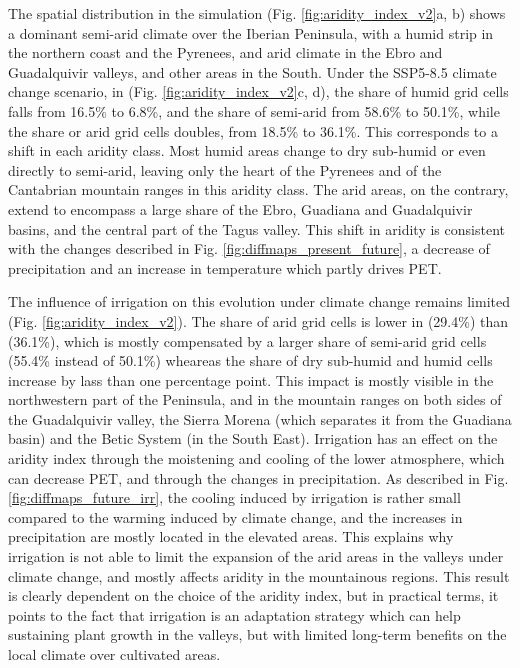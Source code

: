 The spatial distribution in the \presnoirr simulation (Fig. \ref{fig:aridity_index_v2}a, b) shows a dominant semi-arid climate over the Iberian Peninsula, with a humid strip in the northern coast and the Pyrenees, and arid climate in the Ebro and Guadalquivir valleys, and other areas in the South.
Under the SSP5-8.5 climate change scenario, in \futnoirr (Fig. \ref{fig:aridity_index_v2}c, d), the share of humid grid cells falls from 16.5\% to 6.8\%, and the share of semi-arid from 58.6\% to 50.1\%, while the share or arid grid cells doubles, from 18.5\% to 36.1\%. This corresponds to a shift in each aridity class. Most humid areas change to dry sub-humid or even directly to semi-arid, leaving only the heart of the Pyrenees and of the Cantabrian mountain ranges in this aridity class. The arid areas, on the contrary, extend to encompass a large share of the Ebro, Guadiana and Guadalquivir basins, and the central part of the Tagus valley. This shift in aridity is consistent with the changes described in Fig. \ref{fig:diffmaps_present_future}, a decrease of precipitation and an increase in temperature which partly drives PET. %

The influence of irrigation on this evolution under climate change remains limited (Fig. \ref{fig:aridity_index_v2}). The share of arid grid cells is lower in \futirr (29.4\%) than \futnoirr (36.1\%), which is mostly compensated by a larger share of semi-arid grid cells (55.4\% instead of 50.1\%) wheareas the share of dry sub-humid and humid cells increase by lass than one percentage point.
This impact is mostly visible in the northwestern part of the Peninsula, and in the mountain ranges on both sides of the Guadalquivir valley, the Sierra Morena (which separates it from the Guadiana basin) and the Betic System (in the South East). Irrigation has an effect on the aridity index through the moistening and cooling of the lower atmosphere, which can decrease PET, and through the changes in precipitation. As described in Fig. \ref{fig:diffmaps_future_irr}, the cooling induced by irrigation is rather small compared to the warming induced by climate change, and the increases in precipitation are mostly located in the elevated areas. This explains why irrigation is not able to limit the expansion of the arid areas in the valleys under climate change, and mostly affects aridity in the mountainous regions. This result is clearly dependent on the choice of the aridity index, but in practical terms, it points to the fact that irrigation is an adaptation strategy which can help sustaining plant growth in the valleys, but with limited long-term benefits on the local climate over cultivated areas.

